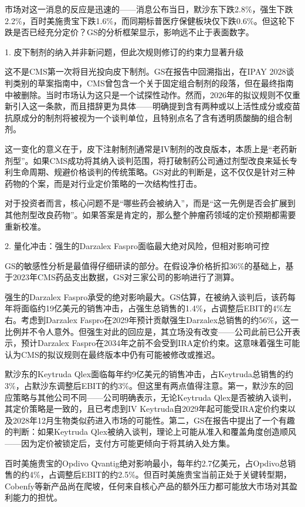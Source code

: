 \documentclass[11pt]{ctexart}
\begin{document}
市场对这一消息的反应是迅速的——消息公布当日，默沙东下跌2.8\%，强生下跌2.2\%，百时美施贵宝下跌1.6\%，而同期标普医疗保健板块仅下跌0.6\%。但这轮下跌是否已经充分定价？GS的分析框架显示，影响远不止于表面数字。

1. 皮下制剂的纳入并非新问题，但此次规则修订的约束力显著升级

这不是CMS第一次将目光投向皮下制剂。GS在报告中回溯指出，在IPAY 2028谈判类别的草案指南中，CMS曾包含一个关于固定组合制剂的段落，但在最终指南中被删除。当时市场认为这只是一个试探性动作。然而，2026年的拟议规则不仅重新引入这一条款，而且措辞更为具体——明确提到含有两种或以上活性成分或疫苗抗原成分的制剂将被视为一个谈判单位，且特别点名了含有透明质酸酶的组合制剂。

这一变化的意义在于，皮下注射制剂通常是IV制剂的改良版本，本质上是“老药新剂型”。如果CMS成功将其纳入谈判范围，将打破制药公司通过剂型改良来延长专利生命周期、规避价格谈判的传统策略。GS对此的判断是，这不仅仅是针对三种药物的个案，而是对行业定价策略的一次结构性打击。

对于投资者而言，核心问题不是“哪些药会被纳入”，而是“这一先例是否会扩展到其他剂型改良药物”。如果答案是肯定的，那么整个肿瘤药领域的定价预期都需要重新校准。

2. 量化冲击：强生的Darzalex Faspro面临最大绝对风险，但相对影响可控

GS的敏感性分析是最值得仔细研读的部分。在假设净价格折扣36\%的基础上，基于2023年CMS药品支出数据，GS对三家公司的影响进行了测算。

强生的Darzalex Faspro承受的绝对影响最大。GS估算，在被纳入谈判后，该药每年将面临约19亿美元的销售冲击，占强生总销售的1.4\%，占调整后EBIT的4\%左右。考虑到Darzalex Faspro在2029年预计贡献强生Darzalex总销售的约56\%，这一比例并不令人意外。但强生对此的回应是，其立场没有改变——公司此前已公开表示，预计Darzalex Faspro在2034年之前不会受到IRA定价约束。这意味着强生可能认为CMS的拟议规则在最终版本中仍有可能被修改或推迟。

默沙东的Keytruda Qlex面临每年约9亿美元的销售冲击，占Keytruda总销售的约3\%，占默沙东调整后EBIT的约3\%。但这里有两点值得注意。第一，默沙东的回应策略与其他公司不同——公司明确表示，无论Keytruda Qlex是否被纳入谈判，其定价策略是一致的，且已考虑到IV Keytruda自2029年起可能受IRA定价约束以及2028年12月生物类似药进入市场的可能性。第二，GS在报告中提出了一个有趣的判断：如果Keytruda Qlex被纳入谈判，理论上可能从准入和覆盖角度创造顺风——因为定价被锁定后，支付方可能更倾向于将其纳入处方集。

百时美施贵宝的Opdivo Qvantig绝对影响最小，每年约2.7亿美元，占Opdivo总销售的约4\%，占调整后EBIT的约2.5\%。但百时美施贵宝当前正处于关键转型期，Cobenfy等新产品尚在爬坡，任何来自核心产品的额外压力都可能放大市场对其盈利能力的担忧。
\end{document}
